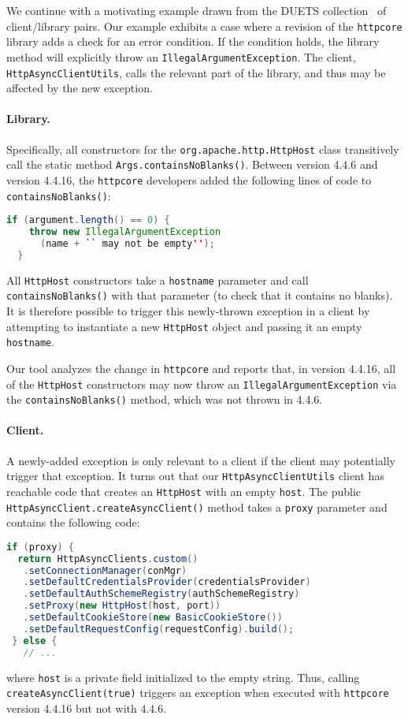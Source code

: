 We continue with a motivating example drawn from the DUETS collection~\cite{DUETS}
of client/library pairs. 
Our example exhibits a case
where a revision of the \texttt{httpcore} library adds a check for an
error condition.  If the condition holds, the library method will
explicitly throw an \texttt{IllegalArgumentException}. The client, \texttt{HttpAsyncClientUtils},
calls the relevant part of the library, and thus may be affected by the new exception.

\paragraph{Library.} Specifically, all constructors for the \texttt{org.apache.http.HttpHost} class transitively call
the static method \texttt{Args.containsNoBlanks()}. Between version 4.4.6 and version 4.4.16, the \texttt{httpcore}
developers added the following lines of code to \texttt{containsNoBlanks()}:
\begin{lstlisting}[language=Java]
  if (argument.length() == 0) {
    throw new IllegalArgumentException
      (name + `` may not be empty'');
  }
\end{lstlisting}
All \texttt{HttpHost} constructors take a \texttt{hostname} parameter and call \texttt{containsNoBlanks()}
with that parameter (to check that it contains no blanks). It is therefore possible to trigger this newly-thrown
exception in a client by attempting to instantiate a new \texttt{HttpHost} object and passing it an empty
\texttt{hostname}.

Our tool analyzes the change in \texttt{httpcore} and reports that, in
version 4.4.16, all of the \texttt{HttpHost} constructors may now throw an
\texttt{IllegalArgumentException} via the \texttt{containsNoBlanks()} method, which
was not thrown in 4.4.6.

\paragraph{Client.} A newly-added exception is only relevant to a client if the client may potentially
trigger that exception. It turns out that our \texttt{HttpAsyncClientUtils} client has reachable code
that creates an \texttt{HttpHost} with an empty \texttt{host}. The
public \texttt{HttpAsyncClient.createAsyncClient()} method
takes a \texttt{proxy} parameter and contains the following code:
\begin{lstlisting}[language=Java,basicstyle=\scriptsize\ttfamily]
 if (proxy) {
  return HttpAsyncClients.custom()
   .setConnectionManager(conMgr)
   .setDefaultCredentialsProvider(credentialsProvider)
   .setDefaultAuthSchemeRegistry(authSchemeRegistry)
   .setProxy(new HttpHost(host, port))
   .setDefaultCookieStore(new BasicCookieStore())
   .setDefaultRequestConfig(requestConfig).build();
 } else {
   // ...
\end{lstlisting}
where \texttt{host} is a private field initialized to the empty string.
Thus, calling \texttt{createAsyncClient(true)} triggers an exception when executed with
\texttt{httpcore} version 4.4.16 but not with 4.4.6.

